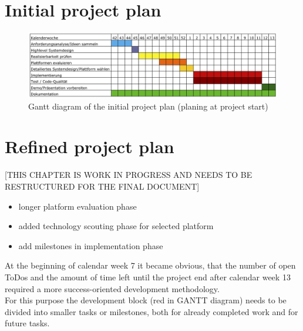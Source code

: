 \section{Initial project plan}

\begin{figure}[h!]
\centering
\includegraphics[width=16cm]{pics/gantt2.png}
\caption{Gantt diagram of the initial project plan (planing at project start)}
\label{gantt1}
\end{figure}

\section{Refined project plan}
[THIS CHAPTER IS WORK IN PROGRESS AND NEEDS TO BE RESTRUCTURED FOR THE FINAL DOCUMENT]

\begin{itemize}
\item longer platform evaluation phase
\item added technology scouting phase for selected platform
\item add milestones in implementation phase
\end{itemize}
At the beginning of calendar week 7 it became obvious, that the number of open ToDos and the amount of time left until the project end after calendar week 13 required a more success-oriented development methodology.\\
For this purpose the development block (red in GANTT diagram) needs to be divided into smaller tasks or milestones, both for already completed work and for future tasks.\\

